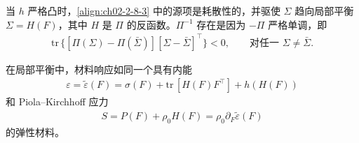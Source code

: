 \documentclass[../../main.tex]{subfiles}
\begin{document}
当 $h$ 严格凸时，\eqref{align:ch02-2-8-3} 中的源项是耗散性的，并驱使 $\Sigma$ 趋向局部平衡 $\Sigma=H(F)$，其中 $H$ 是 $\Pi$ 的反函数。$\Pi^{-1}$ 存在是因为 $-\Pi$ 严格单调，即
\begin{align}
\mathrm{tr}\,\{[\Pi(\Sigma)-\Pi(\bar{\Sigma})][\Sigma-\bar{\Sigma}]^{\top}\}<0,\qquad\text{对任一 }\Sigma\neq\bar{\Sigma}.
\label{align:ch02-2-8-8}
\end{align}

在局部平衡中，材料响应如同一个具有内能
\begin{align}
\varepsilon=\tilde{\varepsilon}(F)=\sigma(F)+\mathrm{tr}\,[H(F)F^{\top}]+h(H(F))
\label{align:ch02-2-8-9}
\end{align}
和 Piola--Kirchhoff 应力
\begin{align}
S=P(F)+\rho_{0}H(F)=\rho_{0}\partial_{F}\tilde{\varepsilon}(F)
\label{align:ch02-2-8-10}
\end{align}
的弹性材料。
\end{document}
